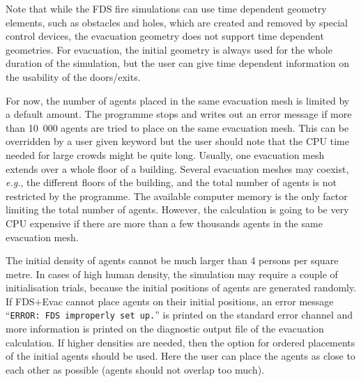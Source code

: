 \documentclass[12pt,a4paper,final,twoside]{stylevk}
\begin{document}
Note that while the FDS fire simulations can use time dependent
geometry elements, such as obstacles and holes, which are created and
removed by special control devices, the evacuation geometry does not
support time dependent geometries.  For evacuation, the initial
geometry is always used for the whole duration of the simulation, but
the user can give time dependent information on the usability of the
doors/exits.


For now, the number of agents placed in the same evacuation mesh is
limited by a default amount.  The programme stops and writes out an
error message if more than 10~000 agents are tried to place on the
same evacuation mesh.  This can be overridden by a user given keyword
but the user should note that the CPU time needed for large crowds
might be quite long.  Usually, one evacuation mesh extends over a
whole floor of a building.  Several evacuation meshes may coexist,
\emph{e.g.}, the different floors of the building, and the total
number of agents is not restricted by the programme.  The available
computer memory is the only factor limiting the total number of
agents.  However, the calculation is going to be very CPU expensive if
there are more than a few thousands agents in the same evacuation
mesh.


The initial density of agents cannot be much larger than 4 persons per
square metre.  In cases of high human density, the simulation may
require a couple of initialisation trials, because the initial
positions of agents are generated randomly.  If FDS+Evac cannot place
agents on their initial positions, an error message ``\texttt{ERROR:
  FDS improperly set up.}'' is printed on the standard error channel
and more information is printed on the diagnostic output file of the
evacuation calculation.  If higher densities are needed, then the
option for ordered placements of the initial agents should be used.
Here the user can place the agents as close to each other as
possible (agents should not overlap too much). 
\end{document}
